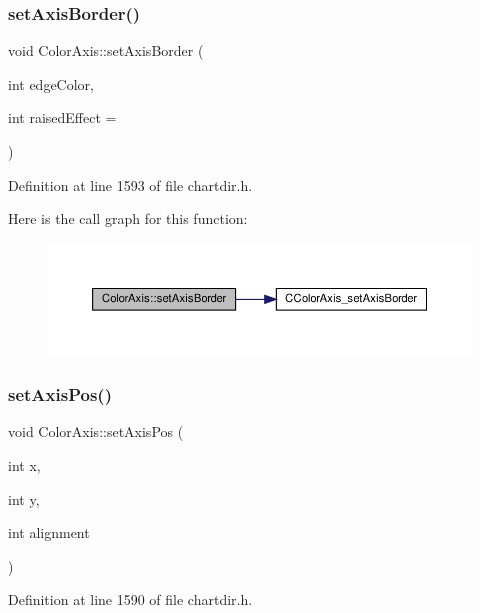 \subsubsection{\texorpdfstring{set\+Axis\+Border()}{setAxisBorder()}}
{\footnotesize\ttfamily void Color\+Axis\+::set\+Axis\+Border (\begin{DoxyParamCaption}\item[{int}]{edge\+Color,  }\item[{int}]{raised\+Effect = {} }\end{DoxyParamCaption})\hspace{0.3cm}{\ttfamily [inline]}}



Definition at line 1593 of file chartdir.\+h.

Here is the call graph for this function\+:
\nopagebreak
\begin{figure}[H]
\begin{center}
\leavevmode
\includegraphics[width=350pt]{class_color_axis_a0b1903f8220e8ba4523e887d79cc0f74_cgraph}
\end{center}
\end{figure}
\mbox{\label{class_color_axis_aa1864826f904e5cdf34ecaaba55647a0}} 
\subsubsection{\texorpdfstring{set\+Axis\+Pos()}{setAxisPos()}}
{\footnotesize\ttfamily void Color\+Axis\+::set\+Axis\+Pos (\begin{DoxyParamCaption}\item[{int}]{x,  }\item[{int}]{y,  }\item[{int}]{alignment }\end{DoxyParamCaption})\hspace{0.3cm}{\ttfamily [inline]}}



Definition at line 1590 of file chartdir.\+h.


